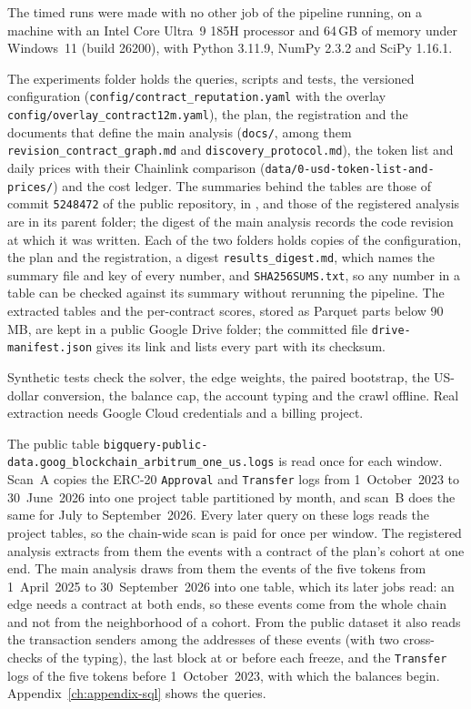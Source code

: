 The timed runs were made with no other job of the pipeline running, on a machine with an Intel Core Ultra~9 185H processor and 64\,GB of memory under Windows~11 (build 26200), with Python 3.11.9, NumPy 2.3.2 and SciPy 1.16.1.

The experiments folder holds the queries, scripts and tests, the versioned configuration (\texttt{config/contract\_reputation.yaml} with the overlay \texttt{config/overlay\_contract12m.yaml}), the plan, the registration and the documents that define the main analysis (\texttt{docs/}, among them \texttt{revision\_contract\_graph.md} and \texttt{discovery\_protocol.md}), the token list and daily prices with their Chainlink comparison (\texttt{data/0-usd-token-list-and-prices/}) and the cost ledger. The summaries behind the tables are those of commit \texttt{5248472} of the public repository, in , and those of the registered analysis are in its parent folder; the digest of the main analysis records the code revision at which it was written. Each of the two folders holds copies of the configuration, the plan and the registration, a digest \texttt{results\_digest.md}, which names the summary file and key of every number, and \texttt{SHA256SUMS.txt}, so any number in a table can be checked against its summary without rerunning the pipeline. The extracted tables and the per-contract scores, stored as Parquet parts below 90\,MB, are kept in a public Google Drive folder; the committed file \texttt{drive-manifest.json} gives its link and lists every part with its checksum.

Synthetic tests check the solver, the edge weights, the paired bootstrap, the US-dollar conversion, the balance cap, the account typing and the crawl offline. Real extraction needs Google Cloud credentials and a billing project.


The public table \texttt{bigquery-public-data.goog\_blockchain\_arbitrum\_one\_us.logs} is read once for each window. Scan~A copies the ERC-20 \texttt{Approval} and \texttt{Transfer} logs from 1~October~2023 to 30~June~2026 into one project table partitioned by month, and scan~B does the same for July to September~2026. Every later query on these logs reads the project tables, so the chain-wide scan is paid for once per window. The registered analysis extracts from them the events with a contract of the plan's cohort at one end. The main analysis draws from them the events of the five tokens from 1~April~2025 to 30~September~2026 into one table, which its later jobs read: an edge needs a contract at both ends, so these events come from the whole chain and not from the neighborhood of a cohort. From the public dataset it also reads the transaction senders among the addresses of these events (with two cross-checks of the typing), the last block at or before each freeze, and the \texttt{Transfer} logs of the five tokens before 1~October~2023, with which the balances begin. Appendix~\ref{ch:appendix-sql} shows the queries.

